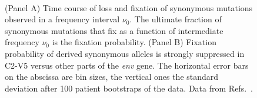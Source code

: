 \documentclass[rmp, twocolumn]{revtex4}
\begin{document}
\begin{figure}
\begin{center}
\\
\caption{(Panel A) Time course of loss and fixation of synonymous mutations
observed in a frequency interval $\nu_0$. The ultimate fraction of synonymous
mutations that fix as a function of intermediate frequency $\nu_0$ is the
fixation probability. (Panel B) Fixation probability of derived synonymous
alleles is strongly suppressed in C2-V5 versus other parts of the {\it env}
gene. The horizontal error bars on the abscissa are bin sizes, the vertical ones
the standard deviation after 100 patient bootstraps of the data. Data from
Refs.~\cite{shankarappa_consistent_1999, bunnik_autologous_2008}.}
\label{fig:fixp}
\end{center}
\end{figure}
\end{document}
